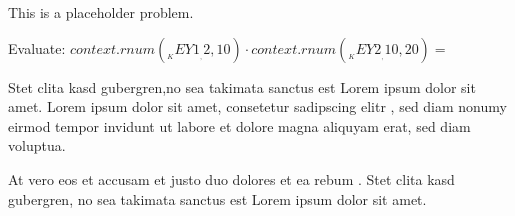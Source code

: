 This is a placeholder problem.
\begin{Problem}
\item Evaluate: ${{context.rnum(__KEY1__, 2, 10)}} \cdot {{context.rnum(__KEY2__, 10, 20)}} = $ 
\item Stet clita kasd gubergren,no sea takimata sanctus est Lorem ipsum dolor sit amet. Lorem ipsum dolor sit amet, consetetur sadipscing elitr , sed diam nonumy eirmod tempor invidunt ut labore et dolore magna aliquyam erat, sed diam voluptua. 
\item At vero eos et accusam et justo duo dolores et ea rebum . Stet clita kasd gubergren, no sea takimata sanctus est Lorem ipsum dolor sit amet. 
\end{Problem}
